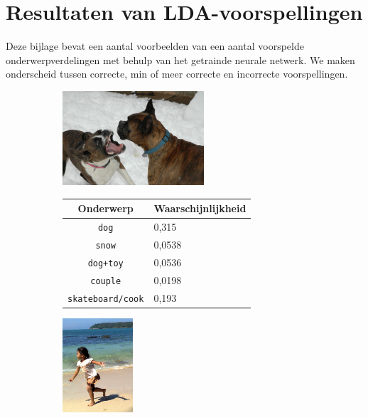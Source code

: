 \chapter{Resultaten van LDA-voorspellingen}
\label{app:LDApredictions}
Deze bijlage bevat een aantal voorbeelden van een aantal voorspelde onderwerpverdelingen met behulp van het getrainde neurale netwerk. We maken onderscheid tussen correcte, min of meer correcte en incorrecte voorspellingen.
\newpage
\begin{figure}
\begin{subfigure}{\textwidth}
    \centering
    \begin{minipage}[t][3.5cm]{.5\linewidth}
    \centering
    \vspace{0pt}
    \includegraphics[height=3.5cm]{Images/LDA/3348384389.jpg}
    \end{minipage}\hfill
    \begin{minipage}[t]{.5\textwidth}
    \centering
    \vspace{0pt}
    \begin{tabular}{cl}
            Onderwerp                           & Waarschijnlijkheid\\
            \hline
            \texttt{dog}             & 0,315 \\
            \texttt{snow}                   & 0,0538 \\
            \texttt{dog+toy} & 0,0536\\
            \texttt{couple}                  & 0,0198 \\
            \texttt{skateboard/cook}           & 0,193 \\
            \hline
        \end{tabular}
    \end{minipage}
\end{subfigure}
\vspace*{4mm}
\begin{subfigure}{\textwidth}
    \centering
    \begin{minipage}[t][3.5cm]{.5\linewidth}
    \centering
    \vspace{0pt}
    \includegraphics[height=3.5cm]{Images/LDA/3107059919.jpg}

\end{minipage}
\end{subfigure}
\end{figure}
